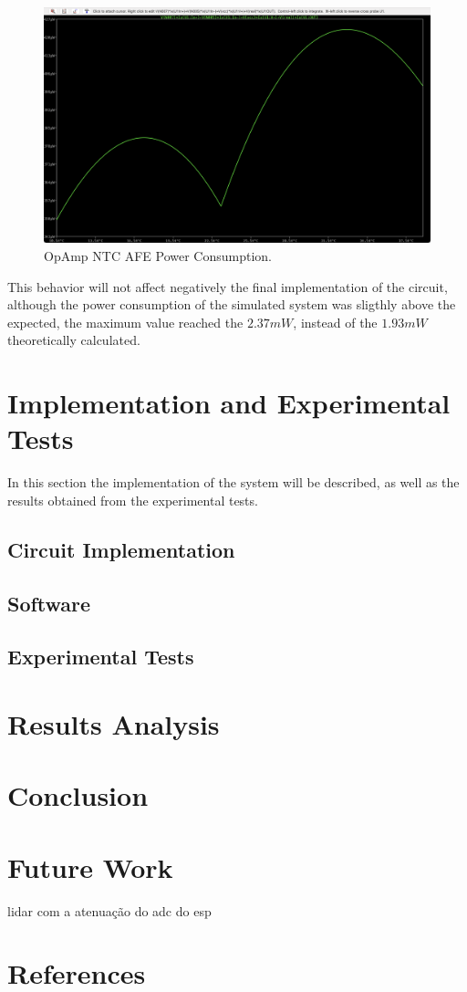 \documentclass[12pt]{article}
\begin{document}
    \begin{figure}[H] 
        \centering
        \includegraphics*[scale = 0.3]{images/PowerAmpop.png}
        \caption{OpAmp NTC AFE Power Consumption.}
        \label{wrap-fig:1}
    \end{figure}

    This behavior will not affect negatively the final implementation of the circuit, although the power consumption of the simulated system was sligthly above the expected, 
    the maximum value reached the $2.37mW$, instead of the $1.93mW$ theoretically calculated.
    
\section{Implementation and Experimental Tests}

In this section the implementation of the system will be described, as well as the results obtained from the experimental tests.

\subsection{Circuit Implementation}

\subsection{Software}

\subsection{Experimental Tests}

\section{Results Analysis}

\section{Conclusion}

\section{Future Work}
lidar com a atenuação do adc do esp

\section{References}

\end{document}
